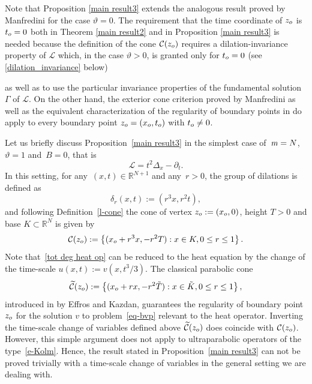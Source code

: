 \documentclass{amsart}
\numberwithin{equation}{section}
\def\vs{\vspace{1mm}}
\def \Lc{{\mathcal{L}}}
\def \r{{\mathbb{R}}}
\renewcommand{\Gamma}{\varGamma}
\begin{document}
Note that Proposition \ref{main result3} extends the analogous result proved by Manfredini \cite{Man97} for the case $\vartheta =0$. The requirement that the time coordinate of $z_{\rm o}$ is $t_{\rm o}= 0$ {both in Theorem \ref{main result2} and in Proposition \ref{main result3}} is needed because the definition of the cone $\mathcal{C}({z_{\rm o}})$ requires a dilation-invariance property of $\Lc$ which, in the case $\vartheta >0$, is granted only for $t_{\rm o}=0$ (see \eqref{dilation_invariance} below) {as well as to use the particular invariance properties of the fundamental solution $\Gamma$ of $\Lc$. On the other hand, the exterior cone criterion proved by Manfredini \cite[Theorem 6.3]{Man97} as well as the equivalent characterization of the regularity of boundary points in \cite[Theorem 5.4]{LU10}  do apply to every boundary point $z_{\rm o}=(x_{\rm o},t_{\rm o})$ with $t_{\rm o} \ne 0$.

\vspace{2mm}
 Let us briefly discuss Proposition~\ref{main result3} in the simplest case of~${\it m}=N$,~$\vartheta = 1$ and~$B = 0$, that is 
\begin{equation}\label{tot deg heat op}
	\Lc = t^2\Delta_x -\partial_t.
\end{equation}
	In this setting, for any~$(x,t) \in \r^{N+1}$ and any~$r>0$, the group of dilations is defined as
	$$
	\delta_r(x,t):= (r^3x,r^2t),
	$$
	and following Definition~\ref{l-cone} the cone of vertex $z_{\rm o} :=(x_{\rm o},0)$, height $T>0$ and base $K \subset \r^N$ is given by
	$$
	\mathcal{C}({z_{\rm o}}) :=\left\{(x_{\rm o} + r^3 x,-r^2T): x \in K, 0 \leq r \leq 1\right\}.
	$$
	Note that~\eqref{tot deg heat op} can be reduced to the heat equation by the change of the time-scale $u(x,t):= v(x,t^3/3)$. The classical parabolic cone 
	$$
	\widetilde{\mathcal{C}}({z_{\rm o}}) :=\left\{(x_{\rm o} + r x,-r^2\tilde{T}): x \in \tilde{K}, 0 \leq r \leq 1\right\},
	$$
	introduced in \cite{EK70} by Effros and Kazdan, guarantees the regularity of boundary point $z_{\rm o}$ for the solution $v$ to problem~\eqref{eq-bvp} relevant to the heat operator. Inverting the time-scale change of variables defined above $\widetilde{\mathcal{C}}({z_{\rm o}})$ does coincide with $\mathcal{C}({z_{\rm o}})$. However, this simple argument does not apply to ultraparabolic operators of the type~\eqref{e-Kolm}. Hence, the result stated in Proposition~\ref{main result3} can not be proved trivially with a time-scale change of variables in the general setting we are dealing with.
    \vs

}
\end{document}
